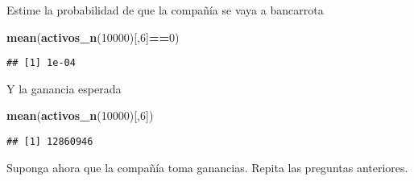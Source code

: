 \documentclass[]{article}
\newenvironment{Shaded}{\begin{snugshade}}{\end{snugshade}}
\newcommand{\DecValTok}[1]{\textcolor[rgb]{0.00,0.00,0.81}{#1}}
\newcommand{\KeywordTok}[1]{\textcolor[rgb]{0.13,0.29,0.53}{\textbf{#1}}}
\newcommand{\NormalTok}[1]{#1}
\newcommand{\OperatorTok}[1]{\textcolor[rgb]{0.81,0.36,0.00}{\textbf{#1}}}
\begin{document}
Estime la probabilidad de que la compañía se vaya a bancarrota

\begin{Shaded}
\begin{Highlighting}[]
\KeywordTok{mean}\NormalTok{(}\KeywordTok{activos_n}\NormalTok{(}\DecValTok{10000}\NormalTok{)[,}\DecValTok{6}\NormalTok{]}\OperatorTok{==}\DecValTok{0}\NormalTok{)}
\end{Highlighting}
\end{Shaded}

\begin{verbatim}
## [1] 1e-04
\end{verbatim}

Y la ganancia esperada

\begin{Shaded}
\begin{Highlighting}[]
\KeywordTok{mean}\NormalTok{(}\KeywordTok{activos_n}\NormalTok{(}\DecValTok{10000}\NormalTok{)[,}\DecValTok{6}\NormalTok{])}
\end{Highlighting}
\end{Shaded}

\begin{verbatim}
## [1] 12860946
\end{verbatim}

Suponga ahora que la compañía toma ganancias. Repita las preguntas
anteriores.
\end{document}
